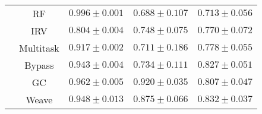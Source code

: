 \begin{table}[H]
\begin{tabular}{ |c|c|c|c|c| }
    & RF & $0.996\pm0.001$ & $0.688\pm0.107$ & $0.713\pm0.056$ \\\cline{2-5}
    & IRV & $0.804\pm0.004$ & $0.748\pm0.075$ & $0.770\pm0.072$ \\\cline{2-5}
    & Multitask & $0.917\pm0.002$ & $0.711\pm0.186$ & $0.778\pm0.055$ \\\cline{2-5}
    & Bypass & $0.943\pm0.004$ & $0.734\pm0.111$ & $0.827\pm0.051$ \\\cline{2-5}
    & GC & $0.962\pm0.005$ & $\mathbf{0.920\pm0.035}$ & $0.807\pm0.047$ \\\cline{2-5}
    & Weave & $0.948\pm0.013$ & $0.875\pm0.066$ & $\mathbf{0.832\pm0.037}$ \\\cline{2-5}
    \hline
    \end{tabular}
    \label{tab:BBBP_Tox21_ToxCast_SIDER}
\end{table}
    

